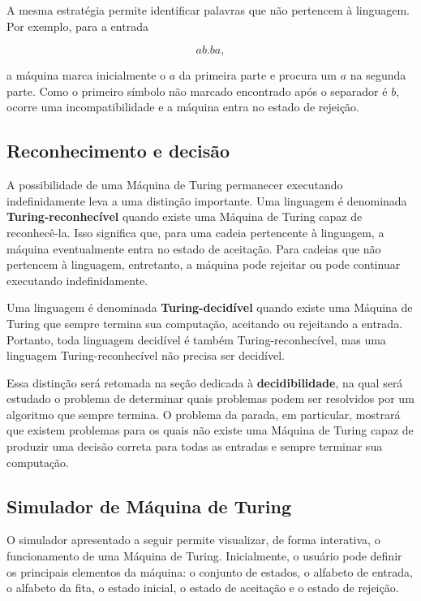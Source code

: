 \documentclass[
  brazilian,
  letterpaper,
]{book}
\theoremstyle{plain}
\theoremstyle{definition}
\theoremstyle{remark}
\begin{document}
A mesma estratégia permite identificar palavras que não pertencem à
linguagem. Por exemplo, para a entrada

\[
ab.ba,
\]

a máquina marca inicialmente o \(a\) da primeira parte e procura um
\(a\) na segunda parte. Como o primeiro símbolo não marcado encontrado
após o separador é \(b\), ocorre uma incompatibilidade e a máquina entra
no estado de rejeição.

\subsection{Reconhecimento e decisão}\label{reconhecimento-e-decisuxe3o}

A possibilidade de uma Máquina de Turing permanecer executando
indefinidamente leva a uma distinção importante. Uma linguagem é
denominada \textbf{Turing-reconhecível} quando existe uma Máquina de
Turing capaz de reconhecê-la. Isso significa que, para uma cadeia
pertencente à linguagem, a máquina eventualmente entra no estado de
aceitação. Para cadeias que não pertencem à linguagem, entretanto, a
máquina pode rejeitar ou pode continuar executando indefinidamente.

Uma linguagem é denominada \textbf{Turing-decidível} quando existe uma
Máquina de Turing que sempre termina sua computação, aceitando ou
rejeitando a entrada. Portanto, toda linguagem decidível é também
Turing-reconhecível, mas uma linguagem Turing-reconhecível não precisa
ser decidível.

Essa distinção será retomada na seção dedicada à
\textbf{decidibilidade}, na qual será estudado o problema de determinar
quais problemas podem ser resolvidos por um algoritmo que sempre
termina. O problema da parada, em particular, mostrará que existem
problemas para os quais não existe uma Máquina de Turing capaz de
produzir uma decisão correta para todas as entradas e sempre terminar
sua computação.

\subsection{Simulador de Máquina de
Turing}\label{simulador-de-muxe1quina-de-turing}

O simulador apresentado a seguir permite visualizar, de forma
interativa, o funcionamento de uma Máquina de Turing. Inicialmente, o
usuário pode definir os principais elementos da máquina: o conjunto de
estados, o alfabeto de entrada, o alfabeto da fita, o estado inicial, o
estado de aceitação e o estado de rejeição.
\end{document}

